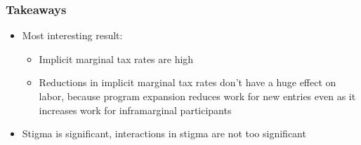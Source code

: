 \documentclass{beamer}
\begin{document}
\begin{frame}
\frametitle[alignment=center]{Takeaways}
\begin{itemize}
\item Most interesting result:
\bigskip
\begin{itemize}
\item Implicit marginal tax rates are high
\bigskip
\item Reductions in implicit marginal tax rates don't have a huge effect on labor, because program expansion reduces work for new entries even as it increases work for inframarginal participants
\end{itemize}
\bigskip
\item Stigma is significant, interactions in stigma are not too significant  
\end{itemize}
\end{frame}
\end{document}
